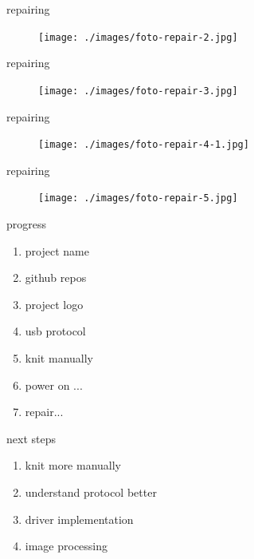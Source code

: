 \begin{frame}{repairing}
    \begin{figure}
        \texttt{[image: ./images/foto-repair-2.jpg]}
    \end{figure}
\end{frame}


\begin{frame}{repairing}
    \begin{figure}
        \texttt{[image: ./images/foto-repair-3.jpg]}
    \end{figure}
\end{frame}

\begin{frame}{repairing}
    \begin{figure}
        \texttt{[image: ./images/foto-repair-4-1.jpg]}
    \end{figure}
\end{frame}

\begin{frame}{repairing}
    \begin{figure}
        \texttt{[image: ./images/foto-repair-5.jpg]}
    \end{figure}
\end{frame}


\begin{frame}{progress}
    \begin{enumerate}
        \item project name \emojiCheck
        \item github repos \emojiCheck
        \item project logo \emojiCheck
        \item usb protocol \emojiCheck
        \item knit manually \emojiCheck
        \item power on ... \emojiFail
        \item repair... \pause \emojiCheck
    \end{enumerate}
\end{frame}


\begin{frame}{next steps}
    \begin{enumerate}
        \item knit more manually
        \item understand protocol better
        \item driver implementation
        \item image processing
    \end{enumerate}
\end{frame}



